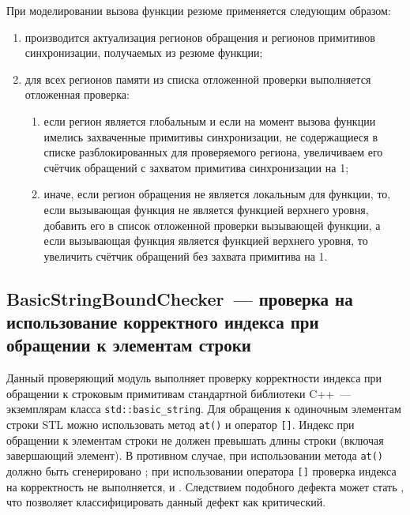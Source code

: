 При моделировании вызова функции резюме применяется следующим образом:

\begin{enumerate}
 \item производится актуализация регионов обращения и регионов примитивов синхронизации, получаемых из резюме функции;
 \item для всех регионов памяти из списка отложенной проверки выполняется отложенная проверка:
 \begin{enumerate}
 \item если регион является глобальным и если на момент вызова функции имелись захваченные примитивы синхронизации, не содержащиеся в списке разблокированных для проверяемого региона, увеличиваем его счётчик обращений с захватом примитива синхронизации на 1;
 \item иначе, если регион обращения не является локальным для функции, то, если вызывающая функция не является функцией верхнего уровня, добавить его в список отложенной проверки вызывающей функции, а если вызывающая функция является функцией верхнего уровня, то увеличить счётчик обращений без захвата примитива на 1.
 \end{enumerate}
\end{enumerate}



\subsection{BasicStringBoundChecker~--- проверка на использование корректного индекса при обращении к элементам строки} \label{sect:basic_string}

Данный проверяющий модуль выполняет проверку корректности индекса при обращении к строковым примитивам стандартной библиотеки C++~--- экземплярам класса \texttt{std::basic\_string}. Для обращения к одиночным элементам строки STL можно использовать метод \texttt{at()} и оператор \texttt{[]}. Индекс при обращении к элементам строки не должен превышать длины строки (включая завершающий элемент). В противном случае, при использовании метода \texttt{at()} должно быть сгенерировано ; при использовании оператора \texttt{[]} проверка индекса на корректность не выполняется, и . Следствием подобного дефекта может стать , что позволяет классифицировать данный дефект как критический.

